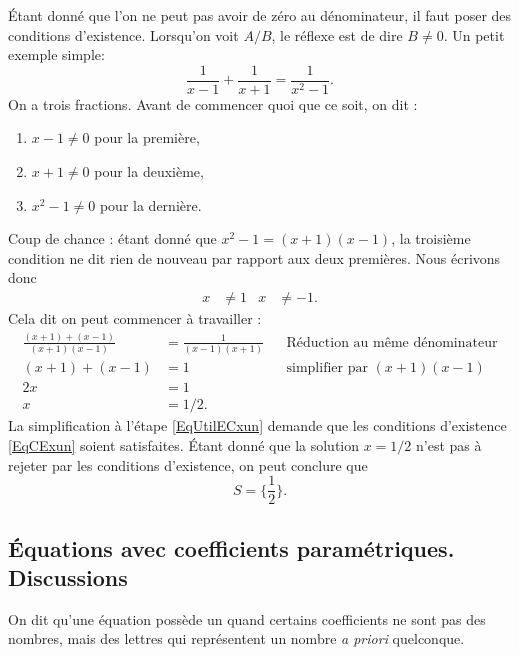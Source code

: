 \documentclass{article}
\begin{document}
Étant donné que l'on ne peut pas avoir de zéro au dénominateur, il faut poser des conditions d'existence. Lorsqu'on voit $A/B$, le réflexe est de dire $B\neq 0$. Un petit exemple \og simple\fg :
\begin{equation} 
  \frac{1}{ x-1 }+\frac{1}{ x+1 }=\frac{1}{ x^{2}-1 }.
\end{equation}
On a trois fractions. Avant de commencer quoi que ce soit, on dit :
\begin{enumerate}
\item $x-1\neq 0$ pour la première,
\item $x+1\neq 0$ pour la deuxième,
\item $x^{2}-1\neq 0$ pour la dernière.
\end{enumerate}
Coup de chance : étant donné que $x^{2}-1=(x+1)(x-1)$, la troisième condition ne dit rien de nouveau par rapport aux deux premières. Nous écrivons donc
\begin{align} \label{EqCExun}
    x&\neq 1& x&\neq-1.
\end{align}
Cela dit on peut commencer à travailler :
\begin{subequations}
\begin{align} 
 \frac{ (x+1)+(x-1) }{ (x+1)(x-1) }&=\frac{1}{ (x-1)(x+1) }&&\text{Réduction au même dénominateur}\\
(x+1)+(x-1)&=1&&\text{simplifier par $(x+1)(x-1)$ } \label{EqUtilECxun}\\
2x&=1\\
x&=1/2.
\end{align}
\end{subequations}
La simplification à l'étape \eqref{EqUtilECxun} demande que les conditions d'existence \eqref{EqCExun} soient satisfaites. Étant donné que la solution $x=1/2$ n'est pas à rejeter par les conditions d'existence, on peut conclure que
\begin{equation}
  S=\{ \frac{ 1 }{ 2 } \}.
\end{equation}

\subsection{Équations avec coefficients paramétriques. Discussions}

On dit qu'une équation possède un  quand certains coefficients ne sont pas des nombres, mais des lettres qui représentent un nombre \emph{a priori} quelconque.
\end{document}
